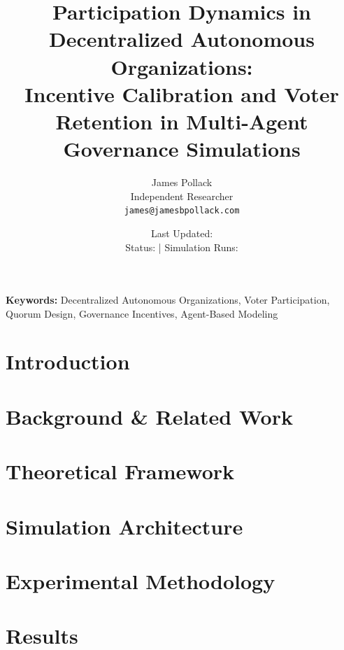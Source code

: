 \documentclass[11pt]{article}
\title{
    \textbf{Participation Dynamics in Decentralized Autonomous Organizations:}\\
    \large Incentive Calibration and Voter Retention in Multi-Agent Governance Simulations
}
\author{
    James Pollack\\
    Independent Researcher\\
    \texttt{james@jamesbpollack.com}
}
\date{
    Last Updated: \lastupdate\\
    \small Status: \paperstatus{} | Simulation Runs: \experimentruns{}
}
\begin{document}
\maketitle

\begin{abstract}

\end{abstract}

\textbf{Keywords:} Decentralized Autonomous Organizations, Voter Participation, Quorum Design, Governance Incentives, Agent-Based Modeling


\section{Introduction}
\label{sec:introduction}


\section{Background \& Related Work}
\label{sec:background}


\section{Theoretical Framework}
\label{sec:theory}


\section{Simulation Architecture}
\label{sec:architecture}


\section{Experimental Methodology}
\label{sec:methodology}


\section{Results}
\label{sec:results}

\end{document}
